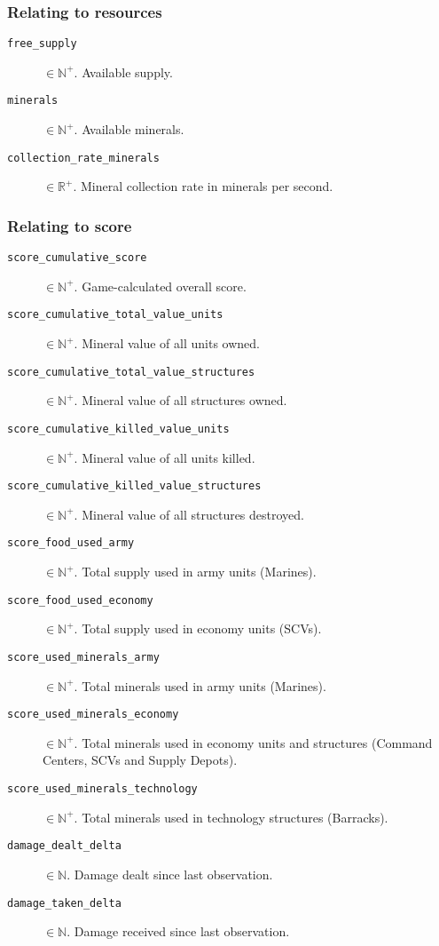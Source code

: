 \subsubsection*{Relating to resources}
\begin{description}
    \item[\texttt{free\_supply}] $\in \mathbb{N}^+$. Available supply.
    \item[\texttt{minerals}] $\in \mathbb{N}^+$. Available minerals.
    \item[\texttt{collection\_rate\_minerals}] $\in \mathbb{R}^+$. Mineral collection rate in minerals per second.
\end{description}

\subsubsection*{Relating to score}
\begin{description}
    \item[\texttt{score\_cumulative\_score}] $\in \mathbb{N}^+$. Game-calculated overall score.
    \item[\texttt{score\_cumulative\_total\_value\_units}] $\in \mathbb{N}^+$. Mineral value of all units owned.
    \item[\texttt{score\_cumulative\_total\_value\_structures}] $\in \mathbb{N}^+$. Mineral value of all structures owned.
    \item[\texttt{score\_cumulative\_killed\_value\_units}] $\in \mathbb{N}^+$. Mineral value of all units killed.
    \item[\texttt{score\_cumulative\_killed\_value\_structures}] $\in \mathbb{N}^+$. Mineral value of all structures destroyed.
    \item[\texttt{score\_food\_used\_army}] $\in \mathbb{N}^+$. Total supply used in army units (Marines).
    \item[\texttt{score\_food\_used\_economy}] $\in \mathbb{N}^+$. Total supply used in economy units (SCVs).
    \item[\texttt{score\_used\_minerals\_army}] $\in \mathbb{N}^+$. Total minerals used in army units (Marines).
    \item[\texttt{score\_used\_minerals\_economy}] $\in \mathbb{N}^+$. Total minerals used in economy units and structures (Command Centers, SCVs and Supply Depots).
    \item[\texttt{score\_used\_minerals\_technology}] $\in \mathbb{N}^+$. Total minerals used in technology structures (Barracks).
    \item[\texttt{damage\_dealt\_delta}] $\in \mathbb{N}$. Damage dealt since last observation.
    \item[\texttt{damage\_taken\_delta}] $\in \mathbb{N}$. Damage received since last observation.
\end{description}

